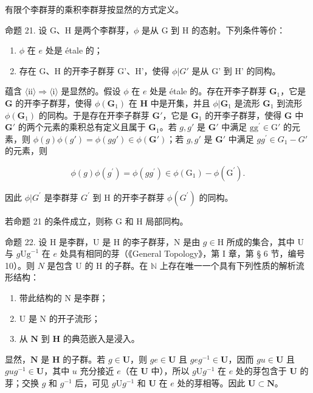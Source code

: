 有限个李群芽的乘积李群芽按显然的方式定义。

命题 21. 设 G、H 是两个李群芽，\(\phi\) 是从 G 到 H 的态射。下列条件等价：

\begin{enumerate}
\def\labelenumi{(\roman{enumi})}
\item
  \(\phi\) 在 \(e\) 处是 étale 的；
\item
  存在 G、H 的开李子群芽 G'、H'，使得 \(\phi|G'\) 是从 G' 到 H' 的同构。
\end{enumerate}

蕴含 \(\langle \mathrm{ii}\rangle \Rightarrow \langle \mathrm{i}\rangle\) 是显然的。假设 \(\phi\) 在 \(e\) 处是 étale 的。存在开李子群芽 \(\mathbf{G}_1\)，它是 \(\mathbf{G}\) 的开李子群芽，使得 \(\phi (\mathbf{G}_1)\) 在 \(\mathbf{H}\) 中是开集，并且 \(\phi |\mathbf{G}_1\) 是流形 \(\mathbf{G}_1\) 到流形 \(\phi (\mathbf{G}_1)\) 的同构。于是存在开李子群芽 \(\mathbf{G}'\)，它是 \(\mathbf{G}_1\) 的开李子群芽，使得 \(\mathbf{G}\) 中 \(\mathbf{G}'\) 的两个元素的乘积总有定义且属于 \(\mathbf{G}_1\)。若 \(g, g'\) 是 \(\mathbf{G}'\) 中满足 \(\mathrm{gg}^{\prime}\in \mathrm{G}'\) 的元素，则 \(\phi (g)\phi (g') = \phi (gg')\in \phi (\mathbf{G}')\)；若 \(g, g'\) 是 \(\mathbf{G}'\) 中满足 \(gg^{\prime}\in G_1 - G'\) 的元素，则

\[
\phi (g) \phi (g ^ {\prime}) = \phi (g g ^ {\prime}) \in \phi (\mathrm{G} _ {1}) - \phi (\mathrm{G} ^ {\prime}).
\]

因此 \(\phi |G^{\prime}\) 是李群芽 \(G^{\prime}\) 到 H 的开李子群芽 \(\phi (G^{\prime})\) 的同构。

若命题 21 的条件成立，则称 G 和 H 局部同构。

命题 22. 设 H 是李群，U 是 H 的李子群芽，N 是由 \(g \in \mathrm{H}\) 所成的集合，其中 U 与 \(g\mathrm{Ug}^{-1}\) 在 \(e\) 处具有相同的芽（《General Topology》，第 I 章，第 § 6 节，编号 10）。则 \(N\) 是包含 U 的 H 的子群。在 \(\mathbb{N}\) 上存在唯一一个具有下列性质的解析流形结构：

\begin{enumerate}
\def\labelenumi{(\roman{enumi})}
\item
  带此结构的 N 是李群；
\item
  U 是 N 的开子流形；
\item
  从 \(\mathbf{N}\) 到 \(\mathbf{H}\) 的典范嵌入是浸入。
\end{enumerate}

显然，\(\mathbf{N}\) 是 \(\mathbf{H}\) 的子群。若 \(g \in \mathbf{U}\)，则 \(ge \in \mathbf{U}\) 且 \(geg^{-1} \in \mathbf{U}\)，因而 \(gu \in \mathbf{U}\) 且 \(gug^{-1} \in \mathbf{U}\)，其中 \(u\) 充分接近 \(e\)（在 \(\mathbf{U}\) 中），所以 \(g\mathrm{U}g^{-1}\) 在 \(e\) 处的芽包含于 \(\mathbf{U}\) 的芽；交换 \(g\) 和 \(g^{-1}\) 后，可见 \(g\mathrm{U}g^{-1}\) 和 \(\mathbf{U}\) 在 \(e\) 处的芽相等。因此 \(\mathbf{U} \subset \mathbf{N}\)。


